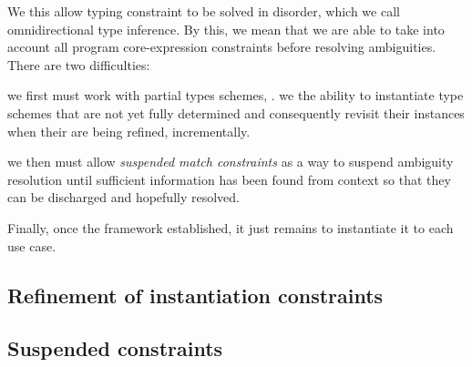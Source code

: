\documentclass[acmsmall,screen,nonacm]{acmart}
\begin{document}
We this allow typing constraint to be solved in disorder, which we call
omnidirectional type inference. By this, we mean that we are able to take
into account all program core-expression constraints before resolving
ambiguities.  There are two difficulties:
\begin{enumerate*}
\item
  we first must work with partial types schemes, \ie. we the ability
  to instantiate type schemes that are not yet fully determined and
  consequently revisit their instances when their are being refined,
  incrementally.
\item
  we then must allow \emph{suspended match constraints} as a way to suspend ambiguity
  resolution until sufficient information has been found from context so
  that they can be discharged and hopefully resolved.

\end{enumerate*}
Finally, once the framework established, it just remains to instantiate it
to each use case.


\subsection {Refinement of instantiation constraints}

\subsection {Suspended constraints} 



\end{document}
